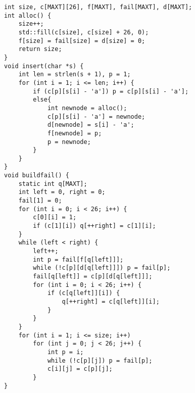 \begin{lstlisting}
int size, c[MAXT][26], f[MAXT], fail[MAXT], d[MAXT];
int alloc() {
	size++;
	std::fill(c[size], c[size] + 26, 0);
	f[size] = fail[size] = d[size] = 0;
	return size;
}
void insert(char *s) {
	int len = strlen(s + 1), p = 1;
	for (int i = 1; i <= len; i++) {
		if (c[p][s[i] - 'a']) p = c[p][s[i] - 'a'];
		else{
			int newnode = alloc();
			c[p][s[i] - 'a'] = newnode;
			d[newnode] = s[i] - 'a';
			f[newnode] = p;
			p = newnode;
		}
	}
}
void buildfail() {
	static int q[MAXT];
	int left = 0, right = 0;
	fail[1] = 0;
	for (int i = 0; i < 26; i++) {
		c[0][i] = 1;
		if (c[1][i]) q[++right] = c[1][i];
	}
	while (left < right) {
		left++;
		int p = fail[f[q[left]]];
		while (!c[p][d[q[left]]]) p = fail[p];
		fail[q[left]] = c[p][d[q[left]]];
		for (int i = 0; i < 26; i++) {
			if (c[q[left]][i]) {
				q[++right] = c[q[left]][i];
			}
		}
	}
	for (int i = 1; i <= size; i++)
		for (int j = 0; j < 26; j++) {
			int p = i;
			while (!c[p][j]) p = fail[p];
			c[i][j] = c[p][j];
		}
}
\end{lstlisting}
